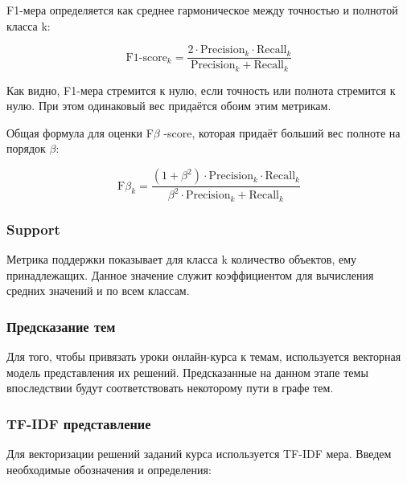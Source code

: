 \documentclass[14pt]{matmex-diploma-custom}
\begin{document}
F1-мера определяется как среднее гармоническое между точностью и полнотой класса k:

\[
\text{F1-score}_{k}=\frac{2\cdot\text{Precision}_{k}\cdot\text{Recall}_{k}}{\text{Precision}_{k} + \text{Recall}_{k}}
\]

Как видно, F1-мера стремится к нулю, если точность или полнота стремится к нулю. При этом одинаковый вес придаётся обоим этим метрикам.

Общая формула для оценки F$\beta$ -score, которая придаёт больший вес полноте на порядок $\beta$:

\[
\text{F$\beta$}_{k}=\frac{(1+\beta^2)\cdot\text{Precision}_{k}\cdot\text{Recall}_{k}}{\beta^2\cdot\text{Precision}_{k} + \text{Recall}_{k}}
\]

\subsubsection*{Support}

Метрика поддержки показывает для класса k количество объектов, ему принадлежащих. Данное значение служит коэффициентом для вычисления средних значений  и  по всем классам.

\subsubsection{Предсказание тем} 
Для того, чтобы привязать уроки онлайн-курса к темам, используется векторная модель представления их решений. Предсказанные на данном этапе темы впоследствии будут соответствовать некоторому пути в графе тем.

\subsubsection*{TF-IDF представление}

Для векторизации решений заданий курса используется TF-IDF мера. Введем необходимые обозначения и определения:
\end{document}
